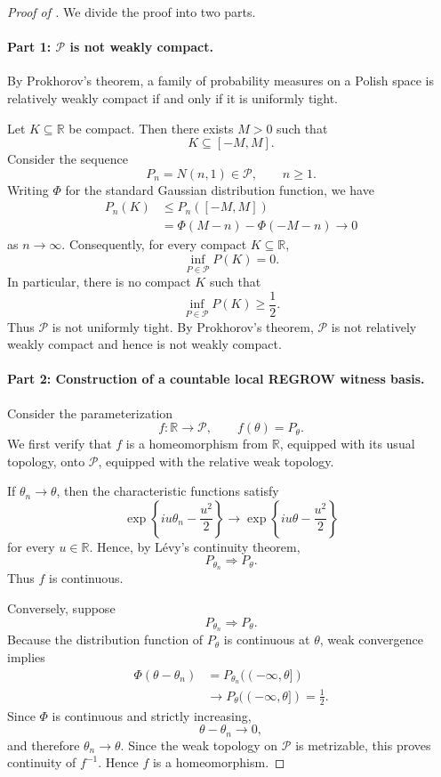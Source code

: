 \documentclass[12pt]{article}
\theoremstyle{spaced}
\theoremstyle{remark}
\begin{document}
\begin{proof}[Proof of ]
We divide the proof into two parts.
\paragraph{Part 1: $\mathcal P$ is not weakly compact.}

By Prokhorov's theorem, a family of probability measures on a
Polish space is relatively weakly compact if and only if it is
uniformly tight.

Let $K\subseteq\mathbb R$ be compact. Then there exists $M>0$
such that
\[
    K\subseteq[-M,M].
\]
Consider the sequence
\[
    P_n=N(n,1)\in\mathcal P,
    \qquad n\ge1.
\]
Writing $\Phi$ for the standard Gaussian distribution function,
we have
\[
\begin{aligned}
    P_n(K)
    &\le
    P_n([-M,M])\\
    &=
    \Phi(M-n)-\Phi(-M-n)
    \longrightarrow0
\end{aligned}
\]
as $n\to\infty$. Consequently, for every compact
$K\subseteq\mathbb R$,
\[
    \inf_{P\in\mathcal P}P(K)=0.
\]
In particular, there is no compact $K$ such that
\[
    \inf_{P\in\mathcal P}P(K)\ge\frac12.
\]
Thus $\mathcal P$ is not uniformly tight. By Prokhorov's
theorem, $\mathcal P$ is not relatively weakly compact and hence
is not weakly compact.

\paragraph{Part 2: Construction of a countable local
REGROW witness basis.}

Consider the parameterization
\[
    f:\mathbb R\longrightarrow\mathcal P,
    \qquad
    f(\theta)=P_\theta.
\]
We first verify that $f$ is a homeomorphism from $\mathbb R$,
equipped with its usual topology, onto $\mathcal P$, equipped
with the relative weak topology.

If $\theta_n\to\theta$, then the characteristic functions satisfy
\[
    \exp\left\{
        i u\theta_n-\frac{u^2}{2}
    \right\}
    \longrightarrow
    \exp\left\{
        i u\theta-\frac{u^2}{2}
    \right\}
\]
for every $u\in\mathbb R$. Hence, by L\'evy's continuity theorem,
\[
    P_{\theta_n}\Rightarrow P_\theta.
\]
Thus $f$ is continuous.

Conversely, suppose
\[
    P_{\theta_n}\Rightarrow P_\theta.
\]
Because the distribution function of $P_\theta$ is continuous
at $\theta$, weak convergence implies
\[
\begin{aligned}
    \Phi(\theta-\theta_n)
    &=
    P_{\theta_n}((-\infty,\theta])\\
    &\longrightarrow
    P_\theta((-\infty,\theta])
    =
    \frac12.
\end{aligned}
\]
Since $\Phi$ is continuous and strictly increasing,
\[
    \theta-\theta_n\longrightarrow0,
\]
and therefore $\theta_n\to\theta$. Since the weak topology on
$\mathcal P$ is metrizable, this proves continuity of $f^{-1}$.
Hence $f$ is a homeomorphism.


\end{proof}
\end{document}
